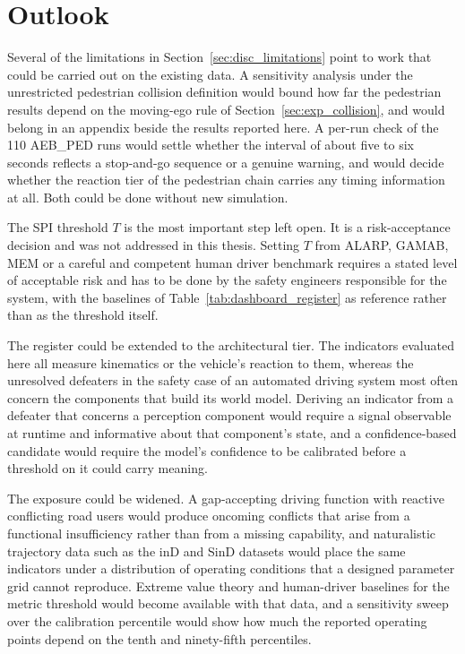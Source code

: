 \section{Outlook}
\label{sec:outlook}

Several of the limitations in Section~\ref{sec:disc_limitations} point to work
that could be carried out on the existing data. A sensitivity analysis under the unrestricted pedestrian collision definition
would bound how far the pedestrian results depend on the moving-ego rule of
Section~\ref{sec:exp_collision}, and would belong in an appendix beside the
results reported here. A per-run check of the 110 AEB\_PED runs would settle
whether the interval of about five to six seconds reflects a stop-and-go sequence
or a genuine warning, and would decide whether the reaction tier of the
pedestrian chain carries any timing information at all. Both could be done
without new simulation.

The SPI threshold $T$ is the most important step left open. It is a
risk-acceptance decision and was not addressed in this thesis. Setting $T$ from
ALARP, GAMAB, MEM or a careful and competent human driver benchmark requires a
stated level of acceptable risk and has to be done by the safety engineers
responsible for the system, with the baselines of Table~\ref{tab:dashboard_register}
as reference rather than as the threshold itself.

The register could be extended to the architectural tier. The indicators
evaluated here all measure kinematics or the vehicle's reaction to them, whereas
the unresolved defeaters in the safety case of an automated driving system most
often concern the components that build its world model. Deriving an indicator from
a defeater that concerns a perception component would require a signal observable at runtime
and informative about that component's state, and a confidence-based candidate
would require the model's confidence to be calibrated before a threshold on it
could carry meaning.

The exposure could be widened. A gap-accepting driving function with reactive
conflicting road users would produce oncoming conflicts that arise from a functional
insufficiency rather than from a missing capability, and naturalistic trajectory
data such as the inD and SinD datasets \cite{bock2020ind} \cite{xu2022sind}
would place
the same indicators under a distribution of operating conditions that a designed
parameter grid cannot reproduce. Extreme value theory and human-driver baselines
for the metric threshold would become available with that data, and a sensitivity
sweep over the calibration percentile would show how much the reported operating
points depend on the tenth and ninety-fifth percentiles.


